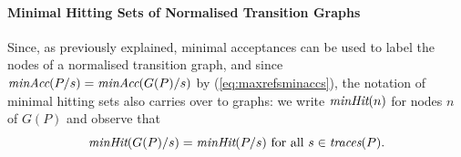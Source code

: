 \documentclass[3p,times]{elsarticle}
\newcommand{\trc}{\text{\it traces}}
\newcommand{\minaccs}{\text{\it minAcc}}
\newcommand{\minhits}{\text{\it minHit}}
\begin{document}
\paragraph{Minimal Hitting Sets of Normalised Transition Graphs} Since, as
previously explained, minimal acceptances can be used to label the nodes of a
normalised transition graph, and since $\minaccs(P/s) = \minaccs(G(P)/s)$ by
(\ref{eq:maxrefsminaccs}), the notation of minimal hitting sets also carries
over to graphs: we write $\minhits(n)$ for nodes $n$ of $G(P)$ and observe
that
\begin{equation}
\label{eq:minhitsGP}
\minhits(G(P)/s) = \minhits(P/s) \ \text{for all}\ s\in \trc(P).
\end{equation}

\end{document}
